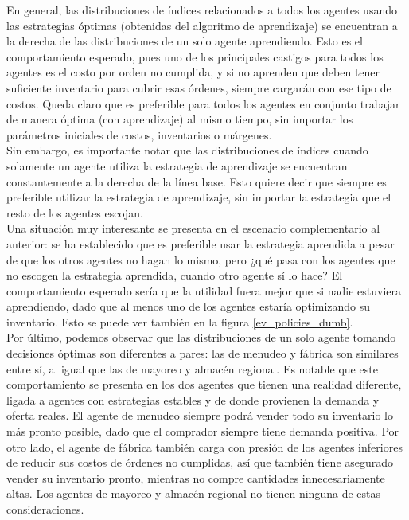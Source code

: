 En general, las distribuciones de índices relacionados a todos los agentes usando las estrategias \'optimas (obtenidas del algoritmo de aprendizaje) se encuentran a la derecha de las distribuciones de un solo agente aprendiendo. Esto es el comportamiento esperado, pues uno de los principales castigos para todos los agentes es el costo por orden no cumplida, y si no aprenden que deben tener suficiente inventario para cubrir esas \'ordenes, siempre cargar\'an con ese tipo de costos. Queda claro que es preferible para todos los agentes en conjunto trabajar de manera \'optima (con aprendizaje) al mismo tiempo, sin importar los par\'ametros iniciales de costos, inventarios o m\'argenes.\\

Sin embargo, es importante notar que las distribuciones de \'indices cuando solamente un agente utiliza la estrategia de aprendizaje se encuentran constantemente a la derecha de la l\'inea base. Esto quiere decir que siempre es preferible utilizar la estrategia de aprendizaje, sin importar la estrategia que el resto de los agentes escojan.\\

Una situaci\'on muy interesante se presenta en el escenario complementario al anterior: se ha establecido que es preferible usar la estrategia aprendida a pesar de que los otros agentes no hagan lo mismo, pero ¿qu\'e pasa con los agentes que no escogen la estrategia aprendida, cuando otro agente s\'i lo hace? El comportamiento esperado ser\'ia que la utilidad fuera mejor que si nadie estuviera aprendiendo, dado que al menos uno de los agentes estar\'ia optimizando su inventario. Esto se puede ver tambi\'en en la figura \ref{ev_policies_dumb}.\\

Por \'ultimo, podemos observar que las distribuciones de un solo agente tomando decisiones \'optimas son diferentes a pares: las de menudeo y f\'abrica son similares entre s\'i, al igual que las de mayoreo y almac\'en regional. Es notable que este comportamiento se presenta en los dos agentes que tienen una realidad diferente, ligada a agentes con estrategias estables y de donde provienen la demanda y oferta reales. El agente de menudeo siempre podr\'a vender todo su inventario lo m\'as pronto posible, dado que el comprador siempre tiene demanda positiva. Por otro lado, el agente de f\'abrica tambi\'en carga con presi\'on de los agentes inferiores de reducir sus costos de \'ordenes no cumplidas, as\'i que tambi\'en tiene asegurado vender su inventario pronto, mientras no compre cantidades innecesariamente altas. Los agentes de mayoreo y almac\'en regional no tienen ninguna de estas consideraciones. \\

